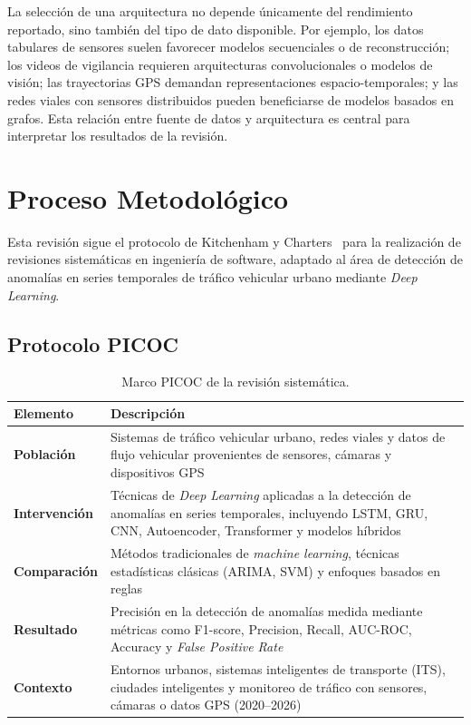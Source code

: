 \documentclass[12pt, a4paper]{article}
\begin{document}
La selecci\'{o}n de una arquitectura no depende \'{u}nicamente del rendimiento reportado, sino tambi\'{e}n del tipo de dato disponible. Por ejemplo, los datos tabulares de sensores suelen favorecer modelos secuenciales o de reconstrucci\'{o}n; los videos de vigilancia requieren arquitecturas convolucionales o modelos de visi\'{o}n; las trayectorias GPS demandan representaciones espacio-temporales; y las redes viales con sensores distribuidos pueden beneficiarse de modelos basados en grafos. Esta relaci\'{o}n entre fuente de datos y arquitectura es central para interpretar los resultados de la revisi\'{o}n.

\section{Proceso Metodol\'{o}gico}
\label{sec:metodo}

Esta revisi\'{o}n sigue el protocolo de Kitchenham y Charters~\cite{Kitchenham2007} para la realizaci\'{o}n de revisiones sistem\'{a}ticas en ingenier\'{i}a de software, adaptado al \'{a}rea de detecci\'{o}n de anomal\'{i}as en series temporales de tr\'{a}fico vehicular urbano mediante \textit{Deep Learning}.

\subsection{Protocolo PICOC}

\begin{table}[H]
\centering
\caption{Marco PICOC de la revisi\'{o}n sistem\'{a}tica.}
\label{tab:picoc}
\begin{tabularx}{\linewidth}{>{\bfseries}lX}
\toprule
Elemento & Descripci\'{o}n \\
\midrule
Poblaci\'{o}n    & Sistemas de tr\'{a}fico vehicular urbano, redes viales y datos de flujo vehicular provenientes de sensores, c\'{a}maras y dispositivos GPS \\
Intervenci\'{o}n & T\'{e}cnicas de \textit{Deep Learning} aplicadas a la detecci\'{o}n de anomal\'{i}as en series temporales, incluyendo LSTM, GRU, CNN, Autoencoder, Transformer y modelos h\'{i}bridos \\
Comparaci\'{o}n  & M\'{e}todos tradicionales de \textit{machine learning}, t\'{e}cnicas estad\'{i}sticas cl\'{a}sicas (ARIMA, SVM) y enfoques basados en reglas \\
Resultado        & Precisi\'{o}n en la detecci\'{o}n de anomal\'{i}as medida mediante m\'{e}tricas como F1-score, Precision, Recall, AUC-ROC, Accuracy y \textit{False Positive Rate} \\
Contexto         & Entornos urbanos, sistemas inteligentes de transporte (ITS), ciudades inteligentes y monitoreo de tr\'{a}fico con sensores, c\'{a}maras o datos GPS (2020--2026) \\
\bottomrule
\end{tabularx}
\end{table}
\end{document}
